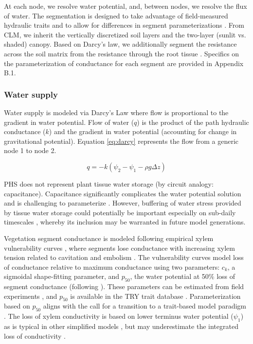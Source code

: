 \documentclass[draft,linenumbers]{agujournal}
\begin{document}
  At each node, we resolve water potential, and, between nodes, we resolve the flux of water.
  The segmentation is designed to take advantage of field-measured hydraulic traits and to allow for differences
  in segment parameterizations \citep{simonin2015, sperry2015}.
  From CLM, we inherit the vertically discretized soil layers and the two-layer (sunlit vs. shaded) canopy.
  Based on Darcy's law, we additionally segment the resistance across the soil matrix from the resistance through the root tissue \citep{williams1996}. 
  Specifics on the parameterization of conductance for each segment are provided in Appendix B.1.

    \subsubsection{Water supply}
    \label{sect:supply}
    Water supply is modeled via Darcy's Law where flow is proportional to the gradient in water potential. 
    Flow of water ($q$) is the product of the path hydraulic conductance ($k$) and 
    the gradient in water potential (accounting for change in gravitational potential). 
    Equation \ref{eq:darcy} represents the flow from a generic node 1 to node 2. 
    
     \begin{linenomath*}
     \begin{equation}
     \label{eq:darcy}
     q = -k\left(\psi_2 - \psi_1 - \rho g \Delta z\right)
     \end{equation}
     \end{linenomath*}
    
    PHS does not represent plant tissue water storage (by circuit analogy: capacitance). 
    Capacitance significantly complicates the water potential solution \citep{celia1990} and is challenging to parameterize \citep{bartlett2016}.   
     However, buffering of water stress provided by tissue water storage could potentially be important especially on sub-daily timescales \citep{meinzer2009,epila2017}, whereby its inclusion may be warranted in future model generations.

     Vegetation segment conductance is modeled following empirical xylem vulnerability curves \citep{tyree1989}, 
     where segments lose conductance with increasing xylem tension related to 
     cavitation and embolism \citep{holbrook2001}.
     The vulnerability curves model loss of conductance relative to maximum conductance using two parameters: 
     $c_k$, a sigmoidal shape-fitting parameter, and 
     $p_{50}$, the water potential at 50\% loss of segment conductance (following \cite{gentine2016}). 
     These parameters can be estimated from field experiments \citep{sack2002}, 
     and $p_{50}$ is available in the TRY trait database \citep{kattge2011}.
     Parameterization based on $p_{50}$ aligns with the call for a transition to a
     trait-based model paradigm \citep{anderegg2015a}.
     The loss of xylem conductivity is based on lower terminus water potential ($\psi_1$)
     as is typical in other simplified models \citep{xu2016}, but 
     may underestimate the integrated loss of conductivity \citep{sperry2015}. 
         
\end{document}
